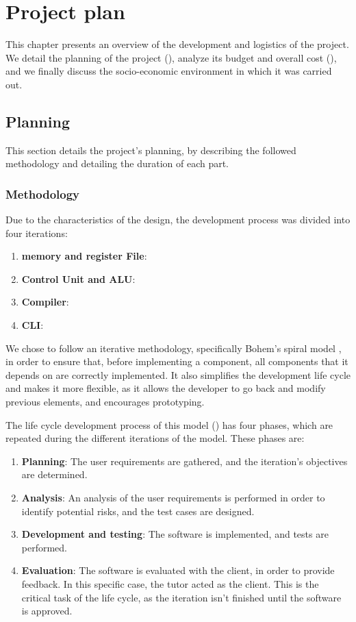 \chapter{Project plan}\label{chap:planning}
This chapter presents an overview of the development and logistics of the project. We detail the planning of the project (), analyze its budget and overall cost (), and we finally discuss the socio-economic environment in which it was carried out.


\section{Planning}\label{sec:planning}
This section details the project's planning, by describing the followed methodology and detailing the duration of each part.

\subsection{Methodology}
Due to the characteristics of the design, the development process was divided into four iterations:
\begin{enumerate}[label=\Roman*.]
  \item \textbf{\Gls{memory} and \Gls{register} File}:
  \item \textbf{Control Unit and \gls{ALU}}:
  \item \textbf{Compiler}:
  \item \textbf{\gls{CLI}}:
\end{enumerate}

We chose to follow an iterative methodology, specifically Bohem's spiral model \parencite{BohemBSpiral}, in order to ensure that, before implementing a component, all components that it depends on are correctly implemented. It also simplifies the development life cycle and makes it more flexible, as it allows the developer to go back and modify previous elements, and encourages prototyping.

The life cycle development process of this model () has four phases, which are repeated during the different iterations of the model. These phases are:
\begin{enumerate}
  \item \textbf{Planning}: The user requirements are gathered, and the iteration's objectives are determined.
  \item \textbf{Analysis}: An analysis of the user requirements is performed in order to identify potential risks, and the test cases are designed.
  \item \textbf{Development and testing}: The software is implemented, and tests are performed.
  \item \textbf{Evaluation}: The software is evaluated with the client, in order to provide feedback. In this specific case, the tutor acted as the client. This is the critical task of the life cycle, as the iteration isn't finished until the software is approved.
\end{enumerate}

